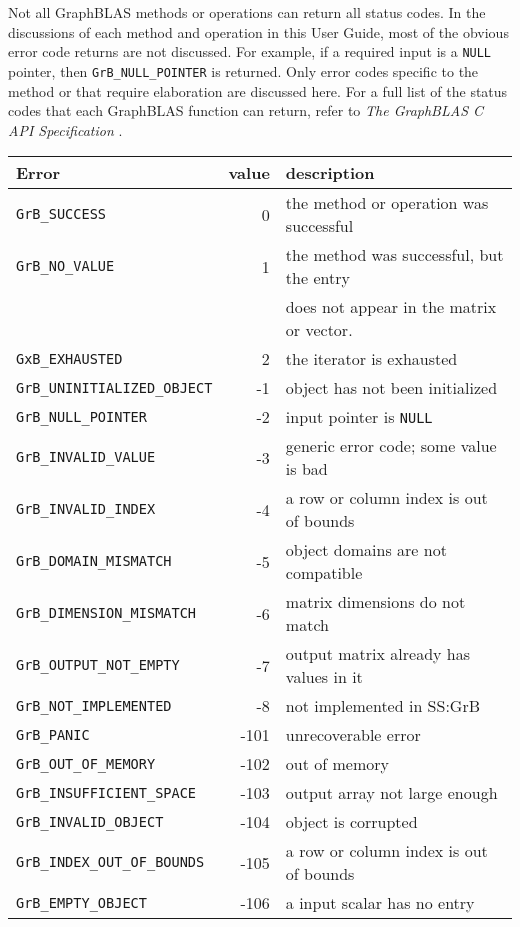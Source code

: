 \documentclass[12pt]{article}
\begin{document}
{Not all GraphBLAS methods or operations can return all status codes.
In the discussions of each method and operation in this User Guide, most of the
obvious error code returns are not discussed.  For example, if a required input
is a \verb'NULL' pointer, then \verb'GrB_NULL_POINTER' is returned.  Only error
codes specific to the method or that require elaboration are discussed here.
For a full list of the status codes that each GraphBLAS function can return,
refer to {\em The GraphBLAS C API Specification} \cite{spec,spec2}.

\vspace{0.2in}
\noindent
{\small
\begin{tabular}{lrp{2.8in}}
\hline
Error                         & value & description \\
\hline
\verb'GrB_SUCCESS'              & 0   & the method or operation was successful \\
\verb'GrB_NO_VALUE'             & 1   & the method was successful, but the entry \\
                                &     & does not appear in the matrix or vector. \\
\verb'GxB_EXHAUSTED'            & 2   & the iterator is exhausted \\
\hline
\hline
\verb'GrB_UNINITIALIZED_OBJECT' & -1   & object has not been initialized \\
\verb'GrB_NULL_POINTER'         & -2   & input pointer is \verb'NULL' \\
\verb'GrB_INVALID_VALUE'        & -3   & generic error code; some value is bad \\
\verb'GrB_INVALID_INDEX'        & -4   & a row or column index is out of bounds \\
\verb'GrB_DOMAIN_MISMATCH'      & -5   & object domains are not compatible \\
\verb'GrB_DIMENSION_MISMATCH'   & -6   & matrix dimensions do not match \\
\verb'GrB_OUTPUT_NOT_EMPTY'     & -7   & output matrix already has values in it \\
\verb'GrB_NOT_IMPLEMENTED'      & -8   & not implemented in SS:GrB \\
\verb'GrB_PANIC'                & -101 & unrecoverable error \\
\verb'GrB_OUT_OF_MEMORY'        & -102 & out of memory \\
\verb'GrB_INSUFFICIENT_SPACE'   & -103 & output array not large enough \\
\verb'GrB_INVALID_OBJECT'       & -104 & object is corrupted \\
\verb'GrB_INDEX_OUT_OF_BOUNDS'  & -105 & a row or column index is out of bounds \\
\verb'GrB_EMPTY_OBJECT'         & -106 & a input scalar has no entry \\
\hline
\end{tabular}
\vspace{0.2in}
}

}
\end{document}
